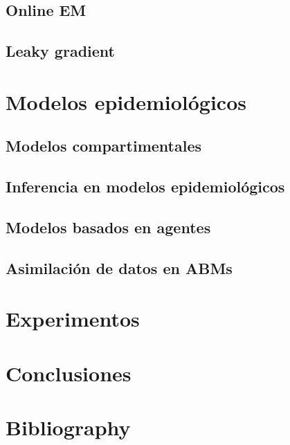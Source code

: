 \documentclass[11pt,a4paper]{article}
\begin{document}
    \subsection{Online EM}
    \subsection{Leaky gradient}

\section{Modelos epidemiológicos}
    \subsection{Modelos compartimentales}
    \subsection{Inferencia en modelos epidemiológicos}
    \subsection{Modelos basados en agentes}
    \subsection{Asimilación de datos en ABMs}

\section{Experimentos}

\section{Conclusiones}

\section{Bibliography}
\printbibliography[heading=none]
\end{document}
